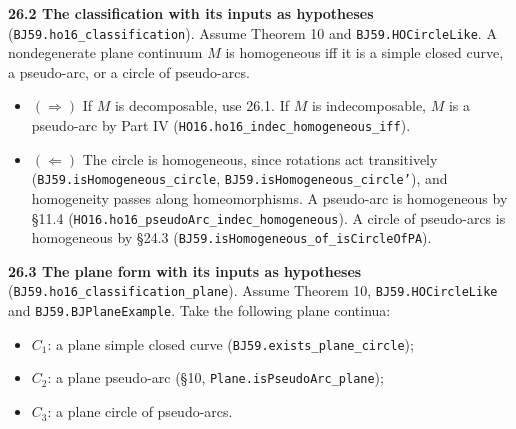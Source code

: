 \documentclass[11pt]{article}
\newcommand{\lean}[1]{\texttt{#1}}
\begin{document}
\textbf{26.2 The classification with its inputs as hypotheses} (\lean{BJ59.\hspace{0pt}ho16\_\hspace{0pt}classification}). Assume Theorem 10 and \lean{BJ59.\hspace{0pt}HOCircleLike}. A nondegenerate plane continuum $M$ is homogeneous iff it is a simple closed curve, a pseudo-arc, or a circle of pseudo-arcs.

\begin{itemize}
  \item $(\Rightarrow)$ If $M$ is decomposable, use 26.1. If $M$ is indecomposable, $M$ is a pseudo-arc by Part IV (\lean{HO16.\hspace{0pt}ho16\_\hspace{0pt}indec\_\hspace{0pt}homogeneous\_\hspace{0pt}iff}).
  \item $(\Leftarrow)$ The circle is homogeneous, since rotations act transitively (\lean{BJ59.\hspace{0pt}isHomogeneous\_\hspace{0pt}circle}, \lean{BJ59.\hspace{0pt}isHomogeneous\_\hspace{0pt}circle'}), and homogeneity passes along homeomorphisms. A pseudo-arc is homogeneous by \S{}11.4 (\lean{HO16.\hspace{0pt}ho16\_\hspace{0pt}pseudoArc\_\hspace{0pt}indec\_\hspace{0pt}homogeneous}). A circle of pseudo-arcs is homogeneous by \S{}24.3 (\lean{BJ59.\hspace{0pt}isHomogeneous\_\hspace{0pt}of\_\hspace{0pt}isCircleOfPA}).
\end{itemize}

\textbf{26.3 The plane form with its inputs as hypotheses} (\lean{BJ59.\hspace{0pt}ho16\_\hspace{0pt}classification\_\hspace{0pt}plane}). Assume Theorem 10, \lean{BJ59.\hspace{0pt}HOCircleLike} and \lean{BJ59.\hspace{0pt}BJPlaneExample}. Take the following plane continua:

\begin{itemize}
  \item $C_1$: a plane simple closed curve (\lean{BJ59.\hspace{0pt}exists\_\hspace{0pt}plane\_\hspace{0pt}circle});
  \item $C_2$: a plane pseudo-arc (\S{}10, \lean{Plane.\hspace{0pt}isPseudoArc\_\hspace{0pt}plane});
  \item $C_3$: a plane circle of pseudo-arcs.
\end{itemize}
\end{document}
